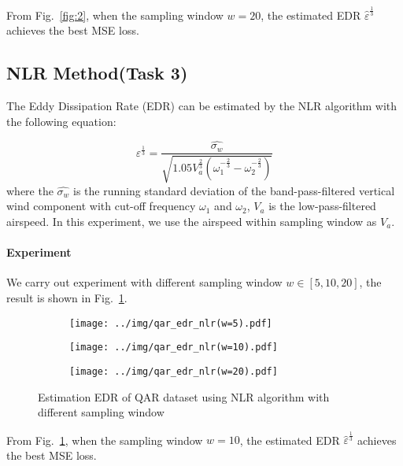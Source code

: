 \documentclass[runningheads]{llncs}
\begin{document}
From Fig.~\ref{fig:2}, when the sampling window $w=20$, the estimated EDR $\hat{\varepsilon}^{\frac13}$ achieves the best MSE loss.

\subsection{NLR Method(Task 3)}

The Eddy Dissipation Rate (EDR) can be estimated by the NLR algorithm with the following equation:

\begin{equation}
    \varepsilon^{\frac13}=\frac{\widehat{\sigma_w}}{\sqrt{1.05V_a^{\frac23}\left(\omega_1^{-\frac23}-\omega_2^{-\frac23}\right)}}
\end{equation}
where the $\widehat{\sigma_w}$ is the running standard deviation of the band-pass-filtered vertical wind component with cut-off frequency $\omega_1$ and $\omega_2$, 
$V_a$ is the low-pass-filtered airspeed. In this experiment, we use the airspeed within sampling window as $V_a$.

\paragraph{Experiment}

We carry out experiment with different sampling window $w \in [5,10,20]$, the result is shown in Fig.~\ref{fig:3}.

\begin{figure}[!htbp]
    \centering
    \begin{subfigure}{.4\textwidth}
        \centering
        \texttt{[image: ../img/qar\_edr\_nlr(w=5).pdf]}
    \end{subfigure}
    \begin{subfigure}{.4\textwidth}
        \centering
        \texttt{[image: ../img/qar\_edr\_nlr(w=10).pdf]}
    \end{subfigure}
    \begin{subfigure}{.4\textwidth}
        \centering
        \texttt{[image: ../img/qar\_edr\_nlr(w=20).pdf]}
    \end{subfigure}
    \caption{Estimation EDR of QAR dataset using NLR algorithm with different sampling window}
    \label{fig:3}
\end{figure}

From Fig.~\ref{fig:3}, when the sampling window $w=10$, the estimated EDR $\hat{\varepsilon}^{\frac13}$ achieves the best MSE loss.
\end{document}
